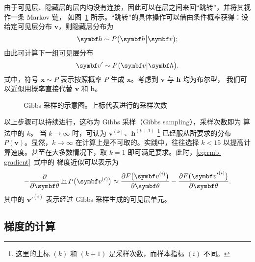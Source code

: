由于可见层、隐藏层的层内均没有连接，因此可以在层之间来回“跳转”，并将其视作一条 Markov 链，
如图~\ref{fig:gibbs-sampling} 所示。“跳转”的具体操作可以借由条件概率获得：设给定可见层分布
$\bm{v}$，则隐藏层分布为
\begin{equation}
  \label{eq:hidden-layer-dist}
  \bm{h} \sim P\qty\big(\bm{h}\big|\bm{v});
\end{equation}
由此可计算下一组可见层分布
\begin{equation}
  \label{eq:visible-layer-dist}
  \bm{v}' \sim P\qty\big(\bm{v}\big|\bm{h}).
\end{equation}
式中，符号 $\bm{x}\sim P$ 表示按照概率 $P$ 生成 $\bm{x}$。考虑到 $\bm{v}$ 与 $\bm{h}$ 均为布尔型，
我们可以近似用概率直接代替 $\bm{v}$ 和 $\bm{h}$。

\begin{figure}[htb]
  \centering
  \caption{Gibbs 采样的示意图。上标代表进行的采样次数}
  \label{fig:gibbs-sampling}
\end{figure}

以上步骤可以持续进行，这称为 Gibbs 采样（Gibbs sampling），采样次数即为 \CDk{} 算法中的 $k$。
当 $k\to\infty$ 时，可认为 $\bm{v}^{(k)}$、$\bm{h}^{(k+1)}$
\footnote{这里的上标 $(k)$ 和 $(k+1)$ 是采样次数，而样本指标 $(i)$ 不同。}
已经服从所要求的分布 $P(\bm{v})$。显然，$k\to\infty$ 在计算上是不可取的。实践中，往往选择 $k<15$
以提高计算速度。甚至在大多数情况下，取 $k=1$ 即可满足要求。此时，\eqref{eq:rmb-gradient}~式中的
梯度近似可以表示为
\begin{equation}
  \label{eq:rmb-gradient-approx}
  - \pdv{\bm{\theta}} \ln P\qty\big(\bm{v}^{(i)})
  \approx \pdv{F\qty\big(\bm{v}^{(i)})}{\bm{\theta}}
        - \pdv{F\qty\big({\bm{v}'}^{(i)})}{\bm{\theta}}.
\end{equation}
其中的 ${\bm{v}'}^{(i)}$ 表示经过 Gibbs 采样生成的可见层单元。

\subsection{梯度的计算}

